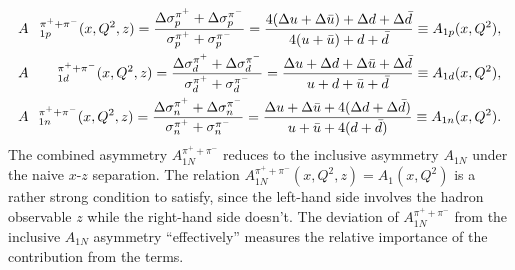 \begin{eqnarray}
\label{Eq:a1pp1}
&A&\hspace{-0.1cm}_{1p}^{\pi^+ + \pi^-} (x,Q^2,z) =  { \Delta \sigma_p^{\pi^+}+\Delta \sigma_p^{\pi^-} \over
\sigma_p^{\pi^+}+ \sigma_p^{\pi^-} }=
{  4(\Delta u+ \Delta \bar{u}) + \Delta d + \Delta \bar{d} 
\over 4(u  + \bar {u}) + d+ \bar{d}  } \equiv A_{1p}(x,Q^2),  \nonumber \\
&A&\hspace{-0.1cm}_{1d}^{\pi^+ + \pi^-}(x,Q^2,z) ={ \Delta \sigma_d^{\pi^+}+\Delta \sigma_d^{\pi^-} \over
\sigma_d^{\pi^+}+ \sigma_d^{\pi^-} }=  
{  \Delta u+\Delta d + \Delta \bar{u}+ \Delta \bar{d}
\over u +d + {\bar u}+ {\bar d} } \equiv A_{1d}(x,Q^2),  \nonumber \\ 
&A&\hspace{-0.1cm}_{1n}^{\pi^+ + \pi^-}(x,Q^2,z) ={ \Delta \sigma_{n}^{\pi^+}+\Delta \sigma_{n}^{\pi^-} \over
\sigma_{n}^{\pi^+}+ \sigma_{n}^{\pi^-} }=  
{  \Delta u + \Delta \bar{u}+ 4(\Delta d + \Delta \bar{d})
\over u + {\bar u}+  4(d + {\bar d}) } \equiv A_{1n}(x,Q^2). 
\end{eqnarray}
The combined asymmetry $A_{1N}^{\pi^+ + \pi^-}$ 
reduces to the inclusive asymmetry $A_{1N}$ under the \lo naive $x$-$z$ separation. 
The relation 
$A_{1N}^{\pi^+ + \pi^-}(x,Q^2,z) = A_1(x,Q^2)$ is a rather strong condition to satisfy, 
since the left-hand side involves the hadron observable $z$ while the right-hand side
doesn't.  The deviation of $A_{1N}^{\pi^+ + \pi^-}$ from the inclusive $A_{1N}$ asymmetry
``effectively'' measures the relative importance of the contribution from the \nlo terms.

